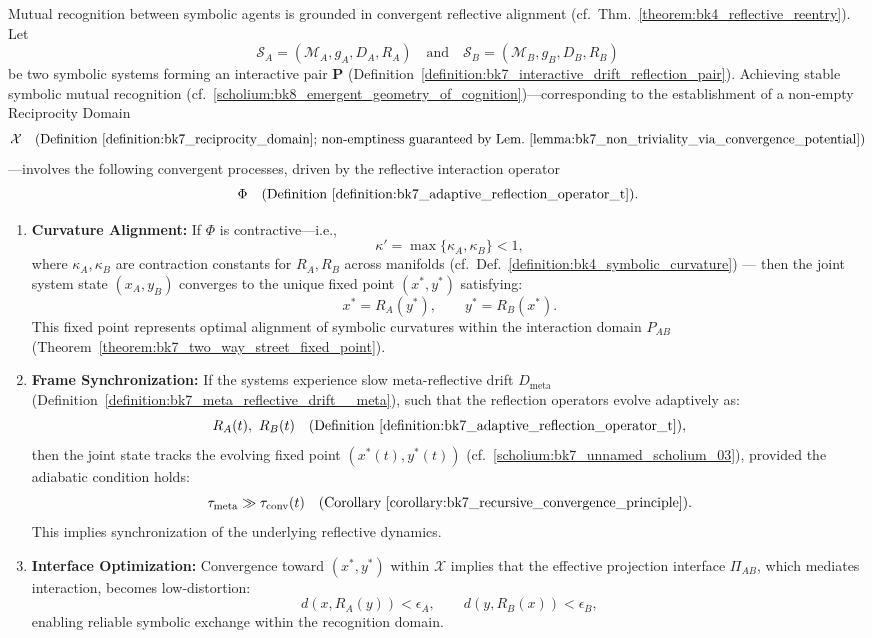 \begin{proposition}
\label{proposition:bk9_mechanisms_of_recognition}
Mutual recognition between symbolic agents is grounded in convergent reflective alignment (cf.~Thm.~\ref{theorem:bk4_reflective_reentry}). Let
\[
\mathcal{S}_A = (\mathcal{M}_A, g_A, D_A, R_A)
\quad \text{and} \quad
\mathcal{S}_B = (\mathcal{M}_B, g_B, D_B, R_B)
\]
be two symbolic systems forming an interactive pair \( \mathbf{P} \) (Definition~\ref{definition:bk7_interactive_drift_reflection_pair}).
Achieving stable symbolic mutual recognition (cf.~\ref{scholium:bk8_emergent_geometry_of_cognition})—corresponding to the establishment of a non-empty Reciprocity Domain
\[
\mathcal{X} \quad \text{(Definition~\ref{definition:bk7_reciprocity_domain}; non-emptiness guaranteed by Lem.~\ref{lemma:bk7_non_triviality_via_convergence_potential})}
\]
—involves the following convergent processes, driven by the reflective interaction operator 
\[
\Phi \quad \text{(Definition~\ref{definition:bk7_adaptive_reflection_operator_t})}.
\]
\begin{enumerate}
    \item \textbf{Curvature Alignment:}  
    If \( \Phi \) is contractive—i.e.,  
    \[
    \kappa' = \max\{\kappa_A, \kappa_B\} < 1,
    \]
    where \( \kappa_A, \kappa_B \) are contraction constants for \( R_A, R_B \) across manifolds (cf.~Def.~\ref{definition:bk4_symbolic_curvature}) ---
    then the joint system state \( (x_A, y_B) \) converges to the unique fixed point \( (x^*, y^*) \) satisfying:
    \[
    x^* = R_A(y^*), \qquad y^* = R_B(x^*).
    \]
    This fixed point represents optimal alignment of symbolic curvatures within the interaction domain \( P_{AB} \)
    (Theorem~\ref{theorem:bk7_two_way_street_fixed_point}).
    \item \textbf{Frame Synchronization:}  
    If the systems experience slow meta-reflective drift \( D_{\text{meta}} \) (Definition~\ref{definition:bk7_meta_reflective_drift__meta}), 
    such that the reflection operators evolve adaptively as:
    \[
    R_A(t),\ R_B(t) \quad \text{(Definition~\ref{definition:bk7_adaptive_reflection_operator_t})},
    \]
    then the joint state tracks the evolving fixed point \( (x^*(t), y^*(t)) \) (cf.~\ref{scholium:bk7_unnamed_scholium_03}),
    provided the adiabatic condition holds:
    \[
    \tau_{\text{meta}} \gg \tau_{\text{conv}}(t)
    \quad \text{(Corollary~\ref{corollary:bk7_recursive_convergence_principle})}.
    \]
    This implies synchronization of the underlying reflective dynamics.
    \item \textbf{Interface Optimization:}  
    Convergence toward \( (x^*, y^*) \) within \( \mathcal{X} \) implies that the effective projection interface 
    \( \Pi_{AB} \), which mediates interaction, becomes low-distortion:
    \[
    d(x, R_A(y)) < \epsilon_A, \qquad d(y, R_B(x)) < \epsilon_B,
    \]
    enabling reliable symbolic exchange within the recognition domain.
\end{enumerate}
\end{proposition}

